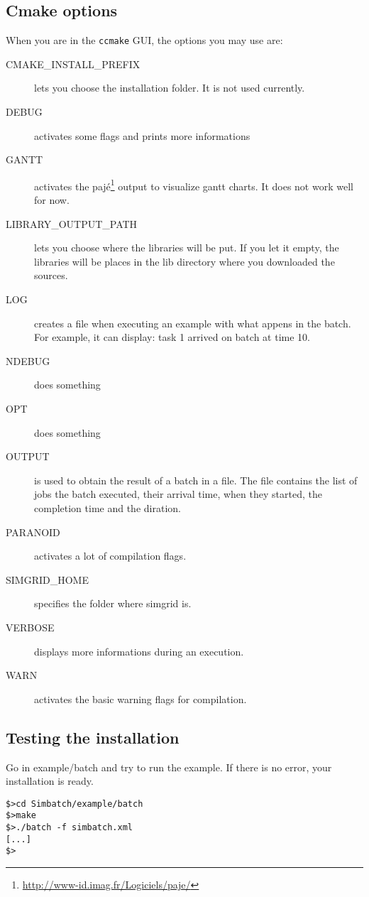 \subsection{Cmake options}
\label{subsec:options}

When you are in the \verb+ccmake+ GUI, the options you may use are:

\begin{description}
  \item [CMAKE\_INSTALL\_PREFIX] lets you choose the installation
    folder. It is not used currently.
  \item [DEBUG] activates some flags and prints more informations
  \item [GANTT] activates the
    paj{\'e}\footnote{\url{http://www-id.imag.fr/Logiciels/paje/}}
    output to visualize gantt charts. It does not work well for now.
  \item [LIBRARY\_OUTPUT\_PATH] lets you choose where the libraries
    will be put. If you let it empty, the libraries will be places in
    the lib directory where you downloaded the sources.
  \item [LOG] creates a file when executing an example with what
    appens in the batch. For example, it can display: task 1 arrived
    on batch at time 10.
  \item [NDEBUG] does something
  \item [OPT] does something
  \item [OUTPUT] is used to obtain the result of a batch in a
    file. The file contains the list of jobs the batch executed, their
    arrival time, when they started, the completion time and the
    diration.
  \item [PARANOID] activates a lot of compilation flags.
  \item [SIMGRID\_HOME] specifies the folder where simgrid is.
  \item [VERBOSE] displays more informations during an execution.
  \item [WARN] activates the basic warning flags for compilation.
\end{description} 

\subsection {Testing the installation}
\label{subsec:testing}

Go in example/batch and try to run the example. If there is no error,
your installation is ready.

{\small
\begin{verbatim}
$>cd Simbatch/example/batch
$>make
$>./batch -f simbatch.xml
[...]
$>
\end{verbatim}}
